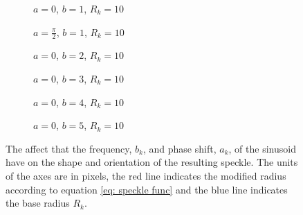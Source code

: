 \documentclass[12pt,oneside,openany,a4paper, %
english, %
masters-t, goldenblock]{usthesis}
\begin{document}
\begin{figure}[H]
    \centering
    \begin{subfigure}[b]{0.32\textwidth}
    \centering
    \resizebox{\linewidth}{!}{
        
        }
        \caption{\footnotesize $a=0$, $b=1$, $R_{k}=10$}
        \label{fig: specklerad 0 1}
    \end{subfigure}
    \hfill
    \begin{subfigure}[b]{0.32\textwidth}
    \centering
    \resizebox{\linewidth}{!}{
        
        }
        \caption{\footnotesize $a=\frac{\pi}{2}$, $b=1$, $R_{k}=10$}
        \label{fig: specklerad 157 1}
    \end{subfigure}
    \hfill
    \begin{subfigure}[b]{0.32\textwidth}
    \centering
    \resizebox{\linewidth}{!}{
        
        }
        \caption{\footnotesize $a=0$, $b=2$, $R_{k}=10$}
    \end{subfigure}
    
    \begin{subfigure}[b]{0.32\textwidth}
    \centering
    \resizebox{\linewidth}{!}{
        
        }
        \caption{\footnotesize $a=0$, $b=3$, $R_{k}=10$}
    \end{subfigure}
    \hfill
    \begin{subfigure}[b]{0.32\textwidth}
    \centering
    \resizebox{\linewidth}{!}{
        
        }
        \caption{\footnotesize $a=0$, $b=4$, $R_{k}=10$}
    \end{subfigure}
    \hfill
    \begin{subfigure}[b]{0.32\textwidth}
    \centering
    \resizebox{\linewidth}{!}{
        
        }
        \caption{\footnotesize $a=0$, $b=5$, $R_{k}=10$}
    \end{subfigure}

    \caption{The affect that the frequency, $b_k$, and phase shift, $a_k$, of the sinusoid have on the shape and orientation of the resulting speckle. The units of the axes are in pixels, the red line indicates the modified radius according to equation \ref{eq: speckle func} and the blue line indicates the base radius $R_{k}$. }
    \label{fig: specklerad}
\end{figure}
\end{document}
